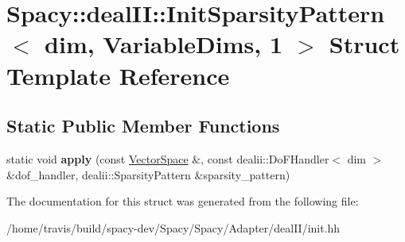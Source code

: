 \hypertarget{structSpacy_1_1dealII_1_1InitSparsityPattern_3_01dim_00_01VariableDims_00_011_01_4}{\section{Spacy\-:\-:deal\-I\-I\-:\-:Init\-Sparsity\-Pattern$<$ dim, Variable\-Dims, 1 $>$ Struct Template Reference}
\label{structSpacy_1_1dealII_1_1InitSparsityPattern_3_01dim_00_01VariableDims_00_011_01_4}
}
\subsection*{Static Public Member Functions}
\begin{DoxyCompactItemize}
\item 
\hypertarget{structSpacy_1_1dealII_1_1InitSparsityPattern_3_01dim_00_01VariableDims_00_011_01_4_a8c905d72f7a62318b6770bb2b60abd62}{static void {\bfseries apply} (const \hyperlink{classSpacy_1_1VectorSpace}{Vector\-Space} \&, const dealii\-::\-Do\-F\-Handler$<$ dim $>$ \&dof\-\_\-handler, dealii\-::\-Sparsity\-Pattern \&sparsity\-\_\-pattern)}\label{structSpacy_1_1dealII_1_1InitSparsityPattern_3_01dim_00_01VariableDims_00_011_01_4_a8c905d72f7a62318b6770bb2b60abd62}

\end{DoxyCompactItemize}


The documentation for this struct was generated from the following file\-:\begin{DoxyCompactItemize}
\item 
/home/travis/build/spacy-\/dev/\-Spacy/\-Spacy/\-Adapter/deal\-I\-I/init.\-hh\end{DoxyCompactItemize}
